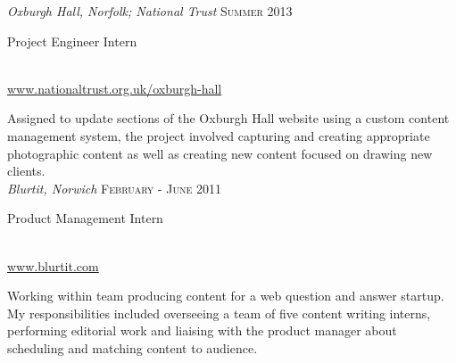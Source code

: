 \documentclass[10pt]{article}
\begin{document}
\begin{minipage}[t]{0.6\textwidth}
{\small{\textit{Oxburgh Hall, Norfolk; National Trust} \hfill {\raggedleft\textsc{Summer 2013}}}}\\
{\raggedright\large {Project Engineer Intern}} \\
{\small{\href{http://www.nationaltrust.org.uk/oxburgh-hall}{www.nationaltrust.org.uk/oxburgh-hall}} \vspace{5pt}}

\normalsize{Assigned to update sections of the Oxburgh Hall website using a custom content management system, the project involved capturing and creating appropriate photographic content as well as creating new content focused on drawing new clients.}\\



{\small{\textit{Blurtit, Norwich} \hfill {\raggedleft\textsc{February - June 2011}}}}\\
{\raggedright\large {Product Management Intern}} \\
{\small{\href{http://www.blurtit.com}{www.blurtit.com}} \vspace{5pt}}

\normalsize{Working within team producing content for a web question and answer startup. My responsibilities included overseeing a team of five content writing interns, performing editorial work and liaising with the product manager about scheduling and matching content to audience.}\\



\end{minipage}
\hfill
\end{document}
